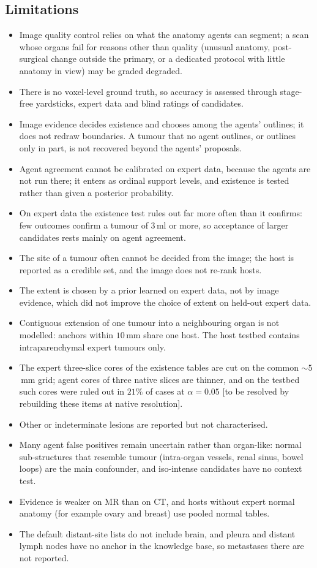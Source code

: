 \documentclass[fleqn,10pt]{olplainarticle}
\begin{document}
\subsection{Limitations}
\begin{itemize}
  \item Image quality control relies on what the anatomy agents can segment; a scan whose organs fail for reasons other than quality (unusual anatomy, post-surgical change outside the primary, or a dedicated protocol with little anatomy in view) may be graded degraded.
  \item There is no voxel-level ground truth, so accuracy is assessed through stage-free yardsticks, expert data and
  blind ratings of candidates.
  \item Image evidence decides existence and chooses among the agents' outlines; it does not redraw boundaries. A tumour
  that no agent outlines, or outlines only in part, is not recovered beyond the agents' proposals.
  \item Agent agreement cannot be calibrated on expert data, because the agents are not run there; it enters as ordinal
  support levels, and existence is tested rather than given a posterior probability.
  \item On expert data the existence test rules out far more often than it confirms: few outcomes confirm a tumour of
  $3$\,ml or more, so acceptance of larger candidates rests mainly on agent agreement.
  \item The site of a tumour often cannot be decided from the image; the host is reported as a credible set, and the image
  does not re-rank hosts.
  \item The extent is chosen by a prior learned on expert data, not by image evidence, which did not improve the choice
  of extent on held-out expert data.
  \item Contiguous extension of one tumour into a neighbouring organ is not modelled: anchors within $10$\,mm share one
  host. The host testbed contains intraparenchymal expert tumours only.
  \item The expert three-slice cores of the existence tables are cut on the common $\sim5$\,mm grid; agent cores of three
  native slices are thinner, and on the testbed such cores were ruled out in $21\%$ of cases at $\alpha=0.05$ [to be
  resolved by rebuilding these items at native resolution].
  \item Other or indeterminate lesions are reported but not characterised.
  \item Many agent false positives remain uncertain rather than organ-like: normal sub-structures that resemble tumour
  (intra-organ vessels, renal sinus, bowel loops) are the main confounder, and iso-intense candidates have no context test.
  \item Evidence is weaker on MR than on CT, and hosts without expert normal anatomy (for example ovary and breast) use pooled
  normal tables.
  \item The default distant-site lists do not include brain, and pleura and distant lymph nodes have no anchor in
  the knowledge base, so metastases there are not reported.
\end{itemize}
\end{document}
